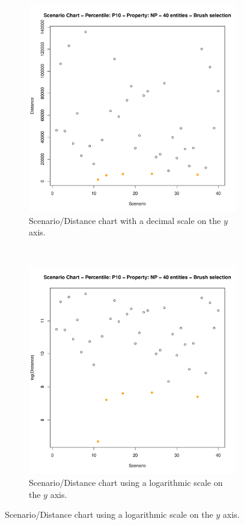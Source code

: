 \documentclass[final,5p,times,twocolumn]{elsarticle}
\begin{document}
\begin{figure}[H]
  \begin{subfigure}[b]{0.48\columnwidth}
    \includegraphics[width=\columnwidth]{scen-brush-40.pdf}
    \caption{Scenario/Distance chart with a decimal scale on the $y$ axis.}
    \label{fig:scen-brush-sample}
  \end{subfigure}
  ~
  \begin{subfigure}[b]{0.48\columnwidth}
    \includegraphics[width=\columnwidth]{scen-brush-40-log.pdf}
    \caption{Scenario/Distance chart using a logarithmic scale on the $y$ axis.}
    \label{fig:scen-brush-sample-log}
  \end{subfigure}


\end{figure}
\end{document}
